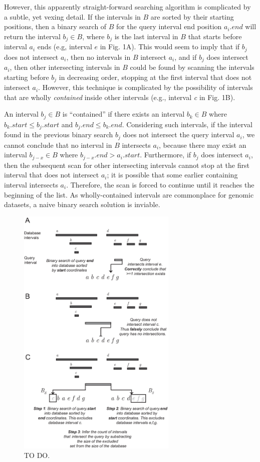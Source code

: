 \documentclass{bioinfo}
\begin{document}
However, this apparently straight-forward searching algorithm is complicated by
a subtle, yet vexing detail. If the intervals in $B$ are sorted by their
starting positions, then a binary search of $B$ for the query interval end
position $a_i.end$ will return the interval $b_j \in B$, where $b_j$ is the last
interval in $B$ that starts before interval $a_i$ ends (e.g, interval $e$ in
Fig. 1A).  This would seem to imply that if $b_j$ does not intersect $a_i$, then
no intervals in $B$ intersect $a_i$, and if $b_j$ does intersect $a_i$, then
other intersecting intervals in $B$ could be found by scanning the intervals
starting before $b_j$ in decreasing order, stopping at the first interval that
does not intersect $a_i$.  However, this technique is complicated by the
possibility of intervals that are wholly {\em contained} inside other intervals
(e.g., interval \emph{c} in Fig. 1B). 

An interval $b_j\in B$ is ``contained'' if there exists an interval $b_k \in B$
where $b_k.start \leq b_j.start$ and $b_j.end \leq b_k.end$.  Considering such
intervals, if the interval found in the previous binary search $b_j$ does not
intersect the query interval $a_i$, we cannot conclude that no interval in $B$
intersects $a_i$, because there may exist an interval $b_{j-x} \in B$ where
$b_{j-x}.end > a_i.start$.  Furthermore, if $b_j$ does intersect $a_i$, then the
subsequent scan for other intersecting intervals cannot stop at the first
interval that does not intersect $a_i$; it is possible that some earlier
containing interval intersects $a_i$. Therefore, the scan is forced to continue
until it reaches the beginning of the list. As wholly-contained intervals are
commonplace for genomic datasets, a naive binary search solution is inviable.

\begin{figure}[h]
		\centering
		\includegraphics[width=3in]{figures/Figure1.v3.eps}
		\caption{TO DO.}
		\label{bitssearching}
\end{figure}
\end{document}
